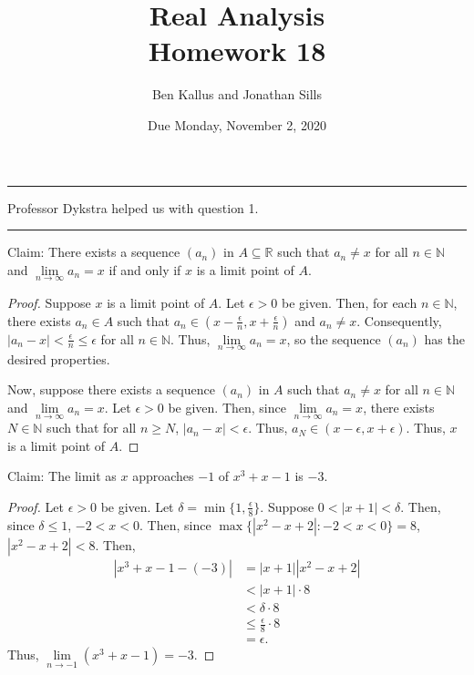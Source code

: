 \documentclass[12pt]{article}
\title{Real Analysis \\ Homework 18}
\author{Ben Kallus and Jonathan Sills}
\date{Due Monday, November 2, 2020}
\begin{document}
\pagecolor{black}
\color{white}
\maketitle

\hrule
\bigskip

 Professor Dykstra helped us with question 1.

\bigskip
\hrule
\bigskip

 Claim: There exists a sequence $(a_n)$ in $A \subseteq \mathbb R$ such that $a_n \neq x$ for all $n \in \mathbb N$ and $\lim\limits_{n\to\infty}a_n=x$ if and only if $x$ is a limit point of $A$.
\begin{proof}
    Suppose $x$ is a limit point of $A$. Let $\epsilon > 0$ be given. Then, for each $n \in \mathbb N$, there exists $a_n \in A$ such that $a_n \in (x-\frac\epsilon n, x + \frac\epsilon n)$ and $a_n \neq x$. Consequently, $|a_n - x| < \frac{\epsilon}{n} \leq \epsilon$ for all $n \in \mathbb N$. Thus, $\lim\limits_{n\to\infty}a_n = x$, so the sequence $(a_n)$ has the desired properties.
    
    Now, suppose there exists a sequence $(a_n)$ in $A$ such that $a_n \neq x$ for all $n \in \mathbb N$ and $\lim\limits_{n\to\infty}a_n=x$. Let $\epsilon > 0$ be given. Then, since $\lim\limits_{n\to\infty}a_n=x$, there exists $N \in \mathbb N$ such that for all $n \geq N$, $|a_n - x| < \epsilon$. Thus, $a_N \in (x-\epsilon, x+\epsilon)$. Thus, $x$ is a limit point of $A$. 
\end{proof}


\newpage
{} Claim: The limit as $x$ approaches $-1$ of $x^3+x-1$ is $-3$.
\begin{proof}
    Let $\epsilon > 0$ be given. Let $\delta = \min\{1, \frac\epsilon8\}$. Suppose $0 < |x + 1| < \delta$. Then, since $\delta \leq 1$, $-2 < x < 0$. Then, since $\max\{|x^2-x+2|:-2 < x < 0\}= 8$, $|x^2-x + 2| < 8$. Then,
    \begin{align*}
        |x^3+x-1 - (-3)| &= |x+1||x^2-x+2| \\
                         &< |x+1| \cdot 8 \\
                         &< \delta \cdot 8 \\
                         &\leq \frac\epsilon8 \cdot 8 \\
                         &= \epsilon.
    \end{align*} Thus, $\lim\limits_{n\to-1}(x^3+x-1)=-3$.
\end{proof}
\end{document}

